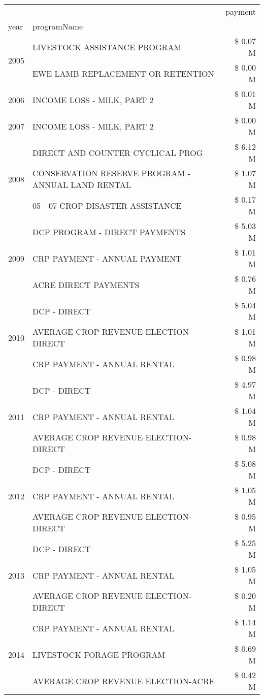 \begin{tabular}{llr}
\toprule
 &  & payment \\
year & programName &  \\
\midrule
\multirow[t]{2}{*}{2005} & LIVESTOCK ASSISTANCE PROGRAM & \$ 0.07 M \\
 & EWE LAMB REPLACEMENT OR RETENTION & \$ 0.00 M \\
\cline{1-3}
2006 & INCOME LOSS - MILK, PART 2 & \$ 0.01 M \\
\cline{1-3}
2007 & INCOME LOSS - MILK, PART 2 & \$ 0.00 M \\
\cline{1-3}
\multirow[t]{3}{*}{2008} & DIRECT AND COUNTER CYCLICAL PROG & \$ 6.12 M \\
 & CONSERVATION RESERVE PROGRAM - ANNUAL LAND RENTAL & \$ 1.07 M \\
 & 05 - 07 CROP DISASTER ASSISTANCE & \$ 0.17 M \\
\cline{1-3}
\multirow[t]{3}{*}{2009} & DCP PROGRAM - DIRECT PAYMENTS & \$ 5.03 M \\
 & CRP PAYMENT - ANNUAL PAYMENT & \$ 1.01 M \\
 & ACRE DIRECT PAYMENTS & \$ 0.76 M \\
\cline{1-3}
\multirow[t]{3}{*}{2010} & DCP - DIRECT & \$ 5.04 M \\
 & AVERAGE CROP REVENUE ELECTION-DIRECT & \$ 1.01 M \\
 & CRP PAYMENT - ANNUAL RENTAL & \$ 0.98 M \\
\cline{1-3}
\multirow[t]{3}{*}{2011} & DCP - DIRECT & \$ 4.97 M \\
 & CRP PAYMENT - ANNUAL RENTAL & \$ 1.04 M \\
 & AVERAGE CROP REVENUE ELECTION-DIRECT & \$ 0.98 M \\
\cline{1-3}
\multirow[t]{3}{*}{2012} & DCP - DIRECT & \$ 5.08 M \\
 & CRP PAYMENT - ANNUAL RENTAL & \$ 1.05 M \\
 & AVERAGE CROP REVENUE ELECTION-DIRECT & \$ 0.95 M \\
\cline{1-3}
\multirow[t]{3}{*}{2013} & DCP - DIRECT & \$ 5.25 M \\
 & CRP PAYMENT - ANNUAL RENTAL & \$ 1.05 M \\
 & AVERAGE CROP REVENUE ELECTION-DIRECT & \$ 0.20 M \\
\cline{1-3}
\multirow[t]{3}{*}{2014} & CRP PAYMENT - ANNUAL RENTAL & \$ 1.14 M \\
 & LIVESTOCK FORAGE PROGRAM & \$ 0.69 M \\
 & AVERAGE CROP REVENUE ELECTION-ACRE & \$ 0.42 M \\

\end{tabular}
